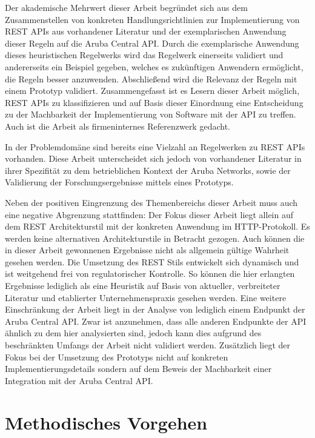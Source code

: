 Der akademische Mehrwert dieser Arbeit begründet sich aus dem Zusammenstellen von konkreten Handlungsrichtlinien zur Implementierung von REST APIs aus vorhandener Literatur und der exemplarischen Anwendung dieser Regeln auf die Aruba Central API. Durch die exemplarische Anwendung dieses heuristischen Regelwerks wird das Regelwerk einerseits validiert und andererseits ein Beispiel gegeben, welches es zukünftigen Anwendern ermöglicht, die Regeln besser anzuwenden. Abschließend wird die Relevanz der Regeln mit einem Prototyp validiert. Zusammengefasst ist es Lesern dieser Arbeit möglich, REST APIs zu klassifizieren und auf Basis dieser Einordnung eine Entscheidung zu der Machbarkeit der Implementierung von Software mit der API zu treffen. Auch ist die Arbeit als firmeninternes Referenzwerk gedacht.

In der Problemdomäne sind bereits eine Vielzahl an Regelwerken zu REST APIs vorhanden. Diese Arbeit unterscheidet sich jedoch von vorhandener Literatur in ihrer Spezifität zu dem betrieblichen Kontext der Aruba Networks, sowie der Validierung der Forschungsergebnisse mittels eines Prototyps.

Neben der positiven Eingrenzung des Themenbereichs dieser Arbeit muss auch eine negative Abgrenzung stattfinden: Der Fokus dieser Arbeit liegt allein auf dem REST Architekturstil mit der konkreten Anwendung im HTTP-Protokoll. Es werden keine alternativen Architekturstile in Betracht gezogen. Auch können die in dieser Arbeit gewonnenen Ergebnisse nicht als allgemein gültige Wahrheit gesehen werden. Die Umsetzung des REST Stils entwickelt sich dynamisch und ist weitgehend frei von regulatorischer Kontrolle. So können die hier erlangten Ergebnisse lediglich als eine Heuristik auf Basis von aktueller, verbreiteter Literatur und etablierter Unternehmenspraxis gesehen werden. Eine weitere Einschränkung der Arbeit liegt in der Analyse von lediglich einem Endpunkt der Aruba Central API. Zwar ist anzunehmen, dass alle anderen Endpunkte der API ähnlich zu dem hier analysierten sind, jedoch kann dies aufgrund des beschränkten Umfangs der Arbeit nicht validiert werden. Zusätzlich liegt der Fokus bei der Umsetzung des Prototyps nicht auf konkreten Implementierungsdetails sondern auf dem Beweis der Machbarkeit einer Integration mit der Aruba Central API.

\section{Methodisches Vorgehen}\label{section:methodisches-vorgehen}


